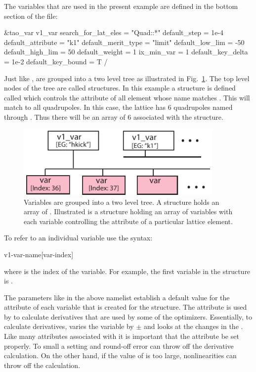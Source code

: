 \documentclass{hitec}     %
\begin{document}
{The variables that are used in the present example are defined in the bottom section of the
 file:
\begin{code}
&tao_var
  v1_var%
  search_for_lat_eles = "Quad::*"
  default_step = 1e-4
  default_attribute = "k1"
  default_merit_type = "limit"
  default_low_lim = -50
  default_high_lim = 50
  default_weight = 1
  ix_min_var = 1
  default_key_delta = 1e-2
  default_key_bound = T
/
\end{code}
Just like ,  are grouped into a two level tree as illustrated in
Fig.~\ref{f:var.tree}.  The top level nodes of the tree are called  structures. In this
example a  structure is defined called  which controls the  attribute of
all element whose name matches . This will match to all quadrupoles. In this case, the
lattice has 6 quadrupoles named  through . Thus there will be an array of 6
 associated with the   structure.


\begin{figure}[tb]
  \centering
  \includegraphics[width=0.90\textwidth]{var-tree.pdf}
  \caption{
Variables are grouped into a two level tree. A  structure holds an array of
. Illustrated is a  structure holding an array of variables with each
variable controlling the  attribute of a particular lattice element.}
  \label{f:var.tree}
\end{figure}


To refer to an individual variable use the syntax:
\begin{code}
v1-var-name[var-index]
\end{code}
where  is the index of the variable. For example, the first variable in the 
structure is .

The parameters like  in the above namelist establish a default value for the
 attribute of each variable that is created for the  structure. The 
attribute is used by \tao to calculate derivatives that are used by some of the optimizers.
Essentially, to calculate derivatives, \tao varies the variable by $\pm$ and looks at the
changes in the . Like many attributes associated with  it is important
that the  attribute be set properly. To small a setting and round-off error can throw off
the derivative calculation. On the other hand, if the value of  is too large,
nonlinearities can throw off the calculation.

}
\end{document}
